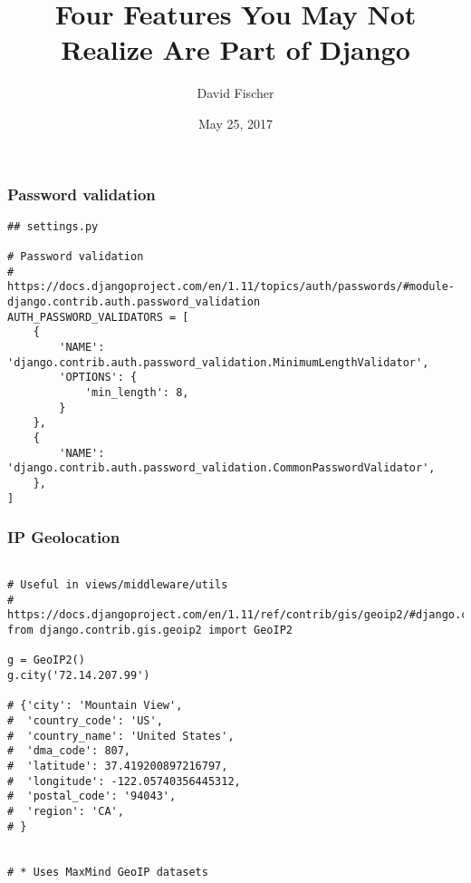 \documentclass[handout]{beamer}
\title{Four Features You May Not Realize Are Part of Django}
\author{David Fischer}
\date{May 25, 2017}
\begin{document}
\maketitle




\begin{frame}[fragile]
\frametitle{Password validation}

{\tiny
\begin{verbatim}
## settings.py

# Password validation
# https://docs.djangoproject.com/en/1.11/topics/auth/passwords/#module-django.contrib.auth.password_validation
AUTH_PASSWORD_VALIDATORS = [
    {
        'NAME': 'django.contrib.auth.password_validation.MinimumLengthValidator',
        'OPTIONS': {
            'min_length': 8,
        }
    },
    {
        'NAME': 'django.contrib.auth.password_validation.CommonPasswordValidator',
    },
]
\end{verbatim}
}

\end{frame}



\begin{frame}[fragile]
\frametitle{IP Geolocation}

{\tiny
\begin{verbatim}

# Useful in views/middleware/utils
# https://docs.djangoproject.com/en/1.11/ref/contrib/gis/geoip2/#django.contrib.gis.geoip2.GeoIP2
from django.contrib.gis.geoip2 import GeoIP2

g = GeoIP2()
g.city('72.14.207.99')

# {'city': 'Mountain View',
#  'country_code': 'US',
#  'country_name': 'United States',
#  'dma_code': 807,
#  'latitude': 37.419200897216797,
#  'longitude': -122.05740356445312,
#  'postal_code': '94043',
#  'region': 'CA',
# }


# * Uses MaxMind GeoIP datasets

\end{verbatim}
}

\end{frame}
\end{document}
